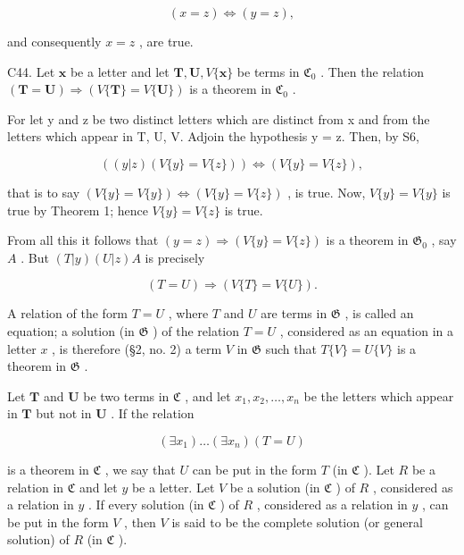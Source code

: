 \[
(x = z) \Longleftrightarrow (y = z),
\]

and consequently \(x = z\) , are true.

C44. Let \(\pmb{x}\) be a letter and let \(\pmb{T}, \pmb{U}, V\{\pmb{x}\}\) be terms in \(\mathfrak{C}_0\) . Then the relation \((\pmb{T} = \pmb{U}) \Longrightarrow (V\{\pmb{T}\} = V\{\pmb{U}\})\) is a theorem in \(\mathfrak{C}_0\) .

For let y and z be two distinct letters which are distinct from x and from the letters which appear in T, U, V. Adjoin the hypothesis y = z. Then, by S6,

\[
((y | z) (V \{y \} = V \{z \})) \Longleftrightarrow (V \{y \} = V \{z \}),
\]

that is to say \((V\{y\} = V\{y\}) \Longleftrightarrow (V\{y\} = V\{z\})\) , is true. Now, \(V\{y\} = V\{y\}\) is true by Theorem 1; hence \(V\{y\} = V\{z\}\) is true.

From all this it follows that \((y = z) \Longrightarrow (V\{y\} = V\{z\})\) is a theorem in \(\mathfrak{G}_0\) , say \(A\) . But \((T|y)(U|z)A\) is precisely

\[
(T = U) \Longrightarrow (V \{T \} = V \{U \}).
\]

A relation of the form \(T = U\) , where \(T\) and \(U\) are terms in \(\mathfrak{G}\) , is called an equation; a solution (in \(\mathfrak{G}\) ) of the relation \(T = U\) , considered as an equation in a letter \(x\) , is therefore (§2, no. 2) a term \(V\) in \(\mathfrak{G}\) such that \(T\{V\} = U\{V\}\) is a theorem in \(\mathfrak{G}\) .

Let \(\pmb{T}\) and \(\pmb{U}\) be two terms in \(\mathfrak{C}\) , and let \(x_1, x_2, \ldots, x_n\) be the letters which appear in \(\pmb{T}\) but not in \(\pmb{U}\) . If the relation

\[
(\exists x _ {1}) \dots (\exists x _ {n}) (T = U)
\]

is a theorem in \(\mathfrak{C}\) , we say that \(U\) can be put in the form \(T\) (in \(\mathfrak{C}\) ). Let \(R\) be a relation in \(\mathfrak{C}\) and let \(y\) be a letter. Let \(V\) be a solution (in \(\mathfrak{C}\) ) of \(R\) , considered as a relation in \(y\) . If every solution (in \(\mathfrak{C}\) ) of \(R\) , considered as a relation in \(y\) , can be put in the form \(V\) , then \(V\) is said to be the complete solution (or general solution) of \(R\) (in \(\mathfrak{C}\) ).

